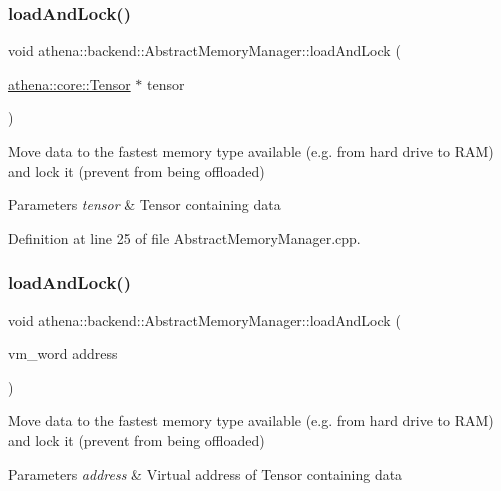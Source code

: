 \subsubsection{\texorpdfstring{load\+And\+Lock()}{loadAndLock()}\hspace{0.1cm}{\footnotesize\ttfamily [1/3]}}
{\footnotesize\ttfamily void athena\+::backend\+::\+Abstract\+Memory\+Manager\+::load\+And\+Lock (\begin{DoxyParamCaption}\item[{\mbox{\hyperlink{classathena_1_1core_1_1_tensor}{athena\+::core\+::\+Tensor}} $\ast$}]{tensor }\end{DoxyParamCaption})}

Move data to the fastest memory type available (e.\+g. from hard drive to R\+AM) and lock it (prevent from being offloaded) 
\begin{DoxyParams}{Parameters}
{\em tensor} & Tensor containing data \\
\hline
\end{DoxyParams}


Definition at line 25 of file Abstract\+Memory\+Manager.\+cpp.

\mbox{\label{classathena_1_1backend_1_1_abstract_memory_manager_a47ea5a77f81f91f803f748720c5c19b5}} 
\subsubsection{\texorpdfstring{load\+And\+Lock()}{loadAndLock()}\hspace{0.1cm}{\footnotesize\ttfamily [2/3]}}
{\footnotesize\ttfamily void athena\+::backend\+::\+Abstract\+Memory\+Manager\+::load\+And\+Lock (\begin{DoxyParamCaption}\item[{vm\+\_\+word}]{address }\end{DoxyParamCaption})}

Move data to the fastest memory type available (e.\+g. from hard drive to R\+AM) and lock it (prevent from being offloaded) 
\begin{DoxyParams}{Parameters}
{\em address} & Virtual address of Tensor containing data \\
\hline
\end{DoxyParams}



